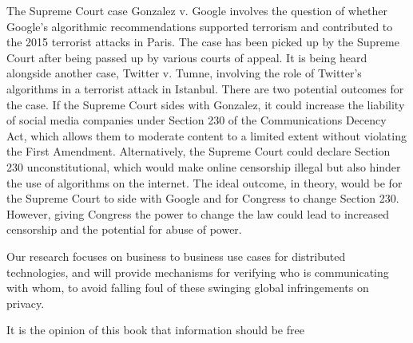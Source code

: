The Supreme Court case Gonzalez v. Google involves the question of whether Google's algorithmic recommendations supported terrorism and contributed to the 2015 terrorist attacks in Paris. The case has been picked up by the Supreme Court after being passed up by various courts of appeal. It is being heard alongside another case, Twitter v. Tumne, involving the role of Twitter's algorithms in a terrorist attack in Istanbul. There are two potential outcomes for the case. If the Supreme Court sides with Gonzalez, it could increase the liability of social media companies under Section 230 of the Communications Decency Act, which allows them to moderate content to a limited extent without violating the First Amendment. Alternatively, the Supreme Court could declare Section 230 unconstitutional, which would make online censorship illegal but also hinder the use of algorithms on the internet. The ideal outcome, in theory, would be for the Supreme Court to side with Google and for Congress to change Section 230. However, giving Congress the power to change the law could lead to increased censorship and the potential for abuse of power.\par
Our research focuses on business to business use cases for distributed technologies, and will provide mechanisms for verifying who is communicating with whom, to avoid falling foul of these swinging global infringements on privacy.\par
It is the opinion of this book that information should be free \cite{swartz2008guerilla}
